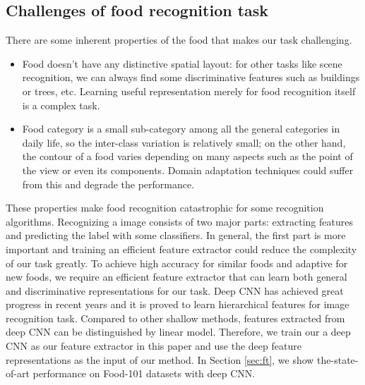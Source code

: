 \subsection{Challenges of food recognition task}
There are some inherent properties of the food that makes our task challenging.
\begin{itemize}
  \item Food doesn't have any distinctive spatial layout: for other tasks like scene recognition, we can always find some discriminative features such as buildings or trees, etc. Learning useful representation merely for food recognition itself is a complex task.
  \item Food category is a small sub-category among all the general categories in daily life, so the inter-class variation is relatively small; on the other hand, the contour of a food varies depending on many aspects such as the point of the view or even its components. Domain adaptation techniques could suffer from this and degrade the performance.
\end{itemize}
These properties make food recognition catastrophic for some recognition algorithms. Recognizing a image consists of two major parts: extracting features and predicting the label with some classifiers. In general, the first part is more important and training an efficient feature extractor could reduce the complexity of our task greatly. To achieve high accuracy for similar foods and adaptive for new foods, we require an efficient feature extractor that can learn both general and discriminative representations for our task. Deep CNN has achieved great progress in recent years and it is proved to learn hierarchical features for image recognition task\cite{zeiler2010deconvolutional}\cite{krizhevsky2012imagenet}\cite{CiresanIJCAI11}. Compared to other shallow methods, features extracted from deep CNN can be distinguished by linear model. Therefore, we train our a deep CNN as our feature extractor in this paper and use the deep feature representations as the input of our method. In Section \ref{sec:ft}, we show the-state-of-art performance on Food-101 datasets with deep CNN.

